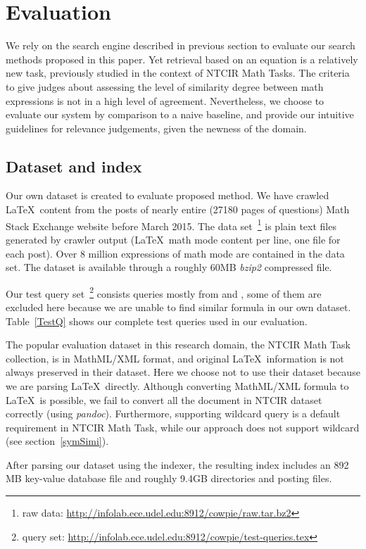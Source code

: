 \section{Evaluation}
We rely on the search engine described in previous section to evaluate our search methods proposed in this paper.
Yet retrieval based on an equation is a relatively new task, previously studied in the context of NTCIR Math Tasks. 
The criteria to give judges about assessing the level of similarity degree between math expressions is not in a high level of agreement.
Nevertheless, we choose to evaluate our system by comparison to a naive baseline, and provide our intuitive guidelines for relevance judgements, given the newness of the domain.

\subsection{Dataset and index}
Our own dataset is created to evaluate proposed method.
We have crawled \LaTeX\ content from the posts of nearly entire (27180 pages of questions) Math Stack Exchange website before March 2015. 
The data set~\footnote{raw data: \url{http://infolab.ece.udel.edu:8912/cowpie/raw.tar.bz2} }
is plain text files generated by crawler output (\LaTeX\ math mode content per line, one file for each post).  
Over 8 million expressions of math mode are contained in the data set. 
The dataset is available through a roughly 60MB \textit{bzip2} compressed file.

Our test query set~\footnote{query set: \url{http://infolab.ece.udel.edu:8912/cowpie/test-queries.tex}} 
consists queries mostly from \cite{ntcirtopic} and \cite{symbolpairs15}, some of them are excluded here because we are unable to find similar formula in our own dataset.
Table~\ref{TestQ} shows our complete test queries used in our evaluation. 

The popular evaluation dataset in this research domain, the NTCIR Math Task collection, is in MathML/XML format, and original \LaTeX\ information is not always preserved in their dataset. 
Here we choose not to use their dataset because we are parsing \LaTeX\ directly.
Although converting MathML/XML formula to \LaTeX\ is possible, we fail to convert all the document in NTCIR dataset correctly (using \textit{pandoc}).
Furthermore, supporting wildcard query is a default requirement in NTCIR Math Task, while our approach does not support wildcard (see section~\ref{symSimi}).

After parsing our dataset using the indexer, the resulting index includes an 892 MB key-value database file and roughly 9.4GB directories and posting files.

